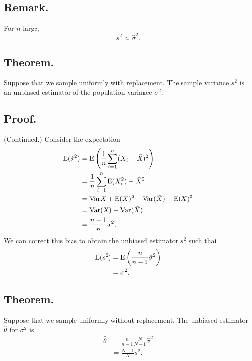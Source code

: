 \documentclass[titlepage]{article}
\begin{document}
\subsection{Remark.} For $n$ large, 
$$s^{2} \approx \hat{\sigma}^{2}.$$

\subsection{Theorem.} Suppose that we sample uniformly with replacement. The sample variance $s^{2}$ is an unbiased estimator of the population variance $\sigma^{2}$.

\subsection{Proof.} (Continued.) Consider the expectation 
\begin{align*}
    \text{E}(\hat{\sigma}^{2}) &= \text{E}\left(\frac{1}{n}\sum_{i=1}^{n}(X_{i} - \bar{X})^{2}\right) \\
                         &= \frac{1}{n}\sum_{i=1}^{n}\text{E}(X_{i}^{2}) - \bar{X}^{2} \\
                         &= \text{Var}{X} + \text{E}(X)^{2} - \text{Var}(\bar{X}) - \text{E}(X)^{2} \\
                         &= \text{Var}(X) - \text{Var}(\bar{X}) \\
                         &= \frac{n-1}{n}\sigma^{2}.
\end{align*}
We can correct this bias to obtain the unbiased estimator $s^{2}$ such that 
\begin{align*}
    \text{E}(s^{2}) &= \text{E}\left(\frac{n}{n-1}\hat{\sigma}^{2}\right) \\
              &= \sigma^{2}.
\end{align*}

\subsection{Theorem.} Suppose that we sample uniformly without replacement. The unbiased estimator $\hat{\theta}$ for $\sigma^{2}$ is 
\begin{align*}
    \hat{\theta} &= \frac{n}{n-1}\frac{N}{N-1}\hat{\sigma}^{2} \\
                 &= \frac{N-1}{N}s^{2}.
\end{align*}
\end{document}
